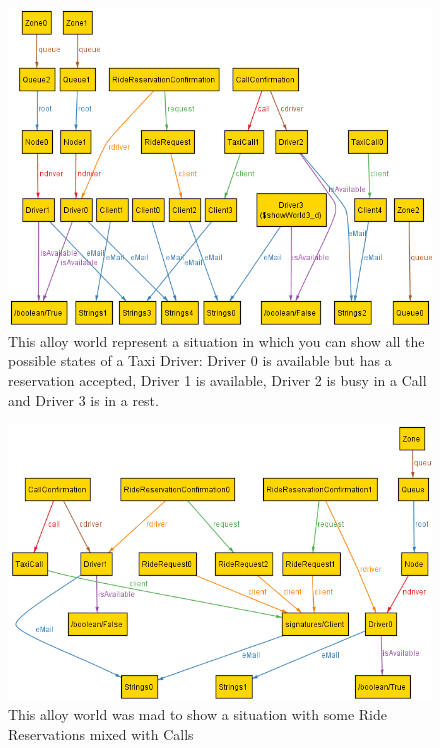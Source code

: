 \documentclass[a4paper]{article}
\begin{document}
\begin{figure}[H]
\includegraphics[width=\worldsWidth]{Alloy-FreeDriver}
\centering
\caption[Alloy World with a Taxi Driver in a rest]{This alloy world represent a situation in which you can show all the possible states of a Taxi Driver: Driver 0 is available but has a reservation accepted, Driver 1 is available, Driver 2 is busy in a Call and Driver 3 is in a rest.
}
\label{fig:alloyworldfreedriver}
\end{figure}

\begin{figure}[H]
\includegraphics[width=\worldsWidth]{Alloy-RideReservation}
\centering
\caption[Alloy World with some Ride Reservations]{This alloy world was mad to show a situation with some Ride Reservations mixed with Calls}
\label{fig:alloyworldridereservation}
\end{figure}
\end{document}
